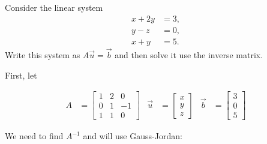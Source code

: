 \begin{example}
Consider the linear system
\begin{align*}
x+2y & = 3, \\
y-z & = 0, \\
x+ y & = 5.
\end{align*}
Write this system as $A\vec{u}=\vec{b}$ and then solve it use the inverse matrix.

\solution

First, let

\begin{align*}
A & =
\begin{bmatrix}
1 & 2 & 0 \\
0 & 1 & -1 \\
1 & 1 & 0
\end{bmatrix}
& \vec{u} & = \begin{bmatrix}
x \\ y \\ z
\end{bmatrix}
& \vec{b} & = \begin{bmatrix}
3 \\ 0 \\ 5
\end{bmatrix}
\end{align*}

We need to find $A^{-1}$ and will use Gauss-Jordan:


\end{example}
